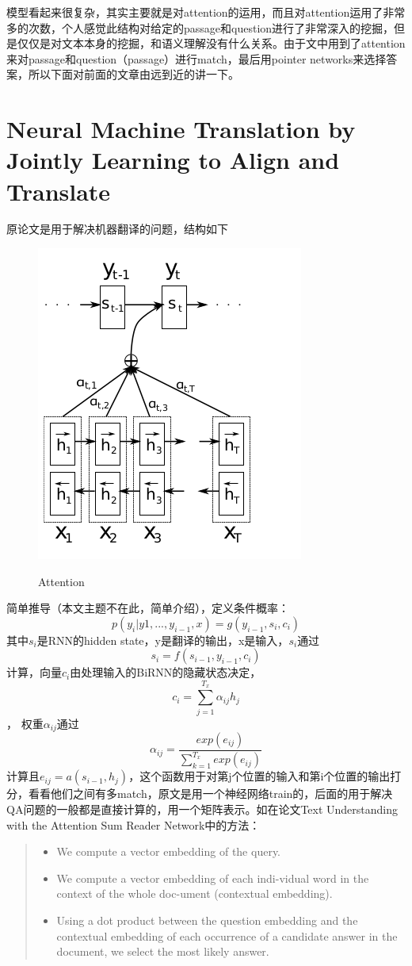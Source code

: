 \documentclass[UTF8]{article}
\begin{document}
模型看起来很复杂，其实主要就是对attention的运用，而且对attention运用了非常多的次数，个人感觉此结构对给定的passage和question进行了非常深入的挖掘，但是仅仅是对文本本身的挖掘，和语义理解没有什么关系。由于文中用到了attention来对passage和question（passage）进行match，最后用pointer networks来选择答案，所以下面对前面的文章由远到近的讲一下。
\section{Neural Machine Translation by Jointly Learning to Align and Translate}

原论文是用于解决机器翻译的问题，结构如下
\begin{figure}[htpb]
    \centering
    \includegraphics[width=0.5\linewidth]{attention.png}
    \label{fig:Attention}
    \caption{Attention}
\end{figure}
简单推导（本文主题不在此，简单介绍），定义条件概率：
$$p(y_i|y1,...,y_{i-1},x)=g(y_{i-1},s_i,c_i)$$
其中$s_i$是RNN的hidden state，y是翻译的输出，x是输入，$s_i$通过 $$s_i=f(s_{i-1},y_{i-1},c_i)$$
计算，向量$c_i$由处理输入的BiRNN的隐藏状态决定，
$$c_i=\sum_{j=1}^{T_x}\alpha_{ij}h_j$$，
权重$\alpha_{ij}$通过
$$\alpha_{ij}=\frac{exp(e_{ij})}{\sum_{k=1}^{T_x}exp(e_{ij})}$$
计算且$e_{ij}=a(s_{i-1},h_j)$，这个函数用于对第j个位置的输入和第i个位置的输出打分，看看他们之间有多match，原文是用一个神经网络train的，后面的用于解决QA问题的一般都是直接计算的，用一个矩阵表示。如在论文Text Understanding with the Attention Sum Reader Network中的方法：
\begin{quotation}
\noindent \begin{itemize}
    \item We compute a vector embedding of the query.

    \item We compute a vector embedding of each indi-vidual word in the context of the whole doc-ument (contextual embedding).

    \item Using a dot product between the question embedding and the contextual embedding of each occurrence of a candidate answer in the document, we select the most likely answer.
\end{itemize}
\end{quotation}
\end{document}
